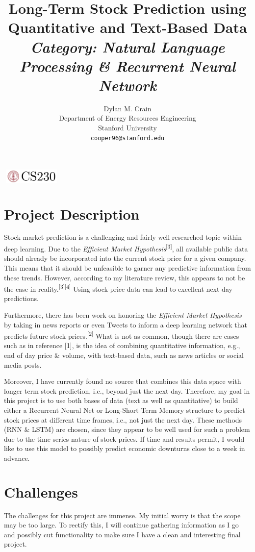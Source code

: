 \documentclass{article}
\title{Long-Term Stock Prediction using Quantitative and Text-Based Data\\
       \large\textit{Category: Natural Language Processing \& Recurrent Neural Network}}
\author{
  Dylan M. Crain\\
  Department of Energy Resources Engineering\\
  Stanford University\\
  \texttt{cooper96@stanford.edu} \\
}
\begin{document}
\begin{center}
\includegraphics[width=3cm, height=0.7cm]{CS230}
\end{center}

\maketitle

\section*{Project Description}
Stock market prediction is a challenging
and fairly well-researched topic within deep learning. Due to the
\textit{Efficient Market Hypothesis}\textsuperscript{[3]}, all
available public data should already be incorporated into the current stock
price for a given company. This means that it should be unfeasible to garner any
predictive information from these trends. However, according to my literature
review, this appears to not be the case in reality.\textsuperscript{[3][4]} Using stock price data can lead to
excellent next day predictions.

Furthermore, there has been work on honoring the \textit{Efficient Market
Hypothesis} by taking in news reports or even Tweets to inform a deep learning
network that predicts future stock prices.\textsuperscript{[2]} What is not as common, though there
are cases such as in reference [1], is the idea of combining
quantitative information, e.g., end of day price \& volume, with text-based
data, such as news articles or social media posts.

Moreover, I have currently found no source that combines this data space with longer term stock prediction,
i.e., beyond just the next day. Therefore, my goal in this project is to use
both bases of data (text as well as quantitative) to build either a
Recurrent Neural Net or Long-Short Term Memory structure to predict stock prices
at different time frames, i.e., not just the next day. These methods (RNN \&
LSTM) are chosen,
since they appear to be well used for such a problem due to the time series
nature of stock prices. If time and results permit, I would
like to use this model to possibly predict economic downturns close to a week in advance.

\section*{Challenges}
The challenges for this project are immense. My initial worry is that the scope
may be too large. To rectify this, I will continue gathering information as I
go and possibly cut functionality to make sure I have a clean and interesting final project.
\end{document}

